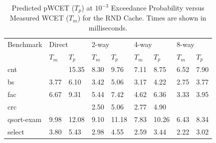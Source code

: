 
\begin{table}[tb]
  \caption{Predicted pWCET ($T_p$) at $10^{-3}$ Exceedance Probability versus Measured WCET ($T_m$) for the RND Cache. Times are shown in milliseconds.}
\label{pWCETTiming}
\centering
\begin{tabular}{lllllllll}
\toprule
Benchmark & \multicolumn{2}{l}{Direct} & \multicolumn{2}{l}{2-way} & \multicolumn{2}{l}{4-way} & \multicolumn{2}{l}{8-way}    \\
\cmidrule(lr){2-3} \cmidrule(lr){4-5} \cmidrule(lr){6-7} \cmidrule(lr){8-9}  
                &  $T_m$ & $T_p$  &  $T_m$ & $T_p$ &  $T_m$ & $T_p$ &  $T_m$ & $T_p$ \\
\midrule


cnt       & \color{red}{11.58} & \color{red}15.35  & 8.30 & 9.76 & 7.11 & 8.75& \color{red}6.52 & \color{red}7.90    \\ 

bs        &  3.77  & 6.10   & 3.42 & 5.06  & 3.17 & 4.22 & 2.75 & 3.77 \\ 
fac &  6.67  & 9.31  & 5.44 & 7.42 & 4.62 & 6.36 & 3.33 & 3.95 \\ 
crc       &  \color{red}{4.49}  & \color{red}{7.23}  & 2.50 & 5.06  & 2.77 & 4.90  & \color{red}{2.82} & \color{red}{4.29}\\ 
qsort-exam     &  9.98  & 12.08  & 9.10 & 11.18 & 7.83 & 10.26 & 6.43 & 8.34 \\ 
select    &  3.80  & 5.43  & 2.98 & 4.55  & 2.59 & 3.44  & 2.22 & 3.02  \\ 
\bottomrule
\end{tabular}
\end{table}


